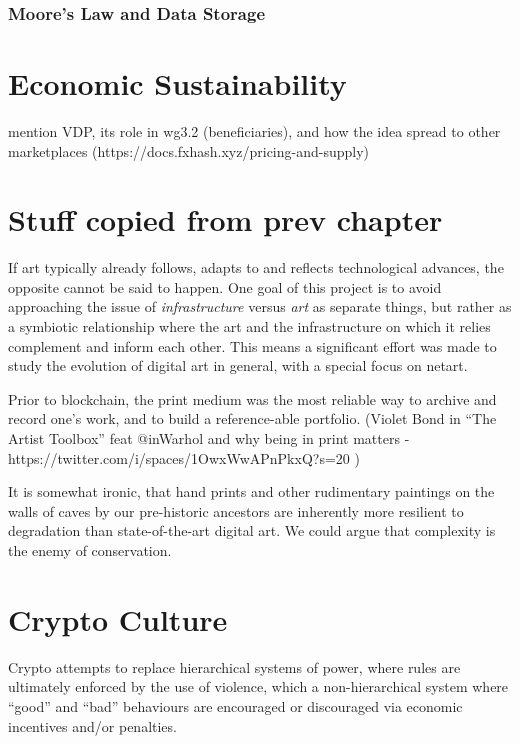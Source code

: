 \subsubsection{Moore's Law and Data Storage}

\section{Economic Sustainability}

mention VDP, its role in wg3.2 (beneficiaries), and how the idea spread to other marketplaces (https://docs.fxhash.xyz/pricing-and-supply)




\section{Stuff copied from prev chapter}



If art typically already follows, adapts to and reflects technological advances, the opposite cannot be said to happen. One goal of this project is to avoid approaching the issue of \emph{infrastructure} versus \emph{art} as separate things, but rather as a symbiotic relationship where the art and the infrastructure on which it relies complement and inform each other. This means a significant effort was made to study the evolution of digital art in general, with a special focus on netart. 

Prior to blockchain, the print medium was the most reliable way to archive and record one's work, and to build a reference-able portfolio. (Violet Bond in ``The Artist Toolbox'' feat @inWarhol and why being in print matters - https://twitter.com/i/spaces/1OwxWwAPnPkxQ?s=20 )

It is somewhat ironic, that hand prints and other rudimentary paintings on the walls of caves by our pre-historic ancestors are inherently more resilient to degradation than state-of-the-art digital art. We could argue that complexity is the enemy of conservation.


\section{Crypto Culture}


Crypto attempts to replace hierarchical systems of power, where rules are ultimately enforced by the use of violence, which a non-hierarchical system where ``good'' and ``bad'' behaviours are encouraged or discouraged via economic incentives and/or penalties.



